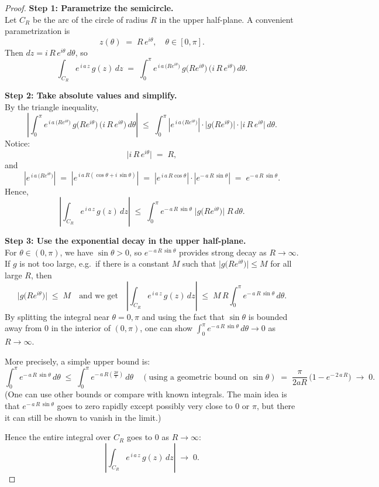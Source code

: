 \documentclass[12pt]{article}
\theoremstyle{definition} %
\theoremstyle{plain} %
\begin{document}
\begin{proof}
\textbf{Step 1: Parametrize the semicircle.}\\
Let $C_R$ be the arc of the circle of radius $R$ in the upper half-plane.  A convenient parametrization is
\[
z(\theta) \;=\; R\,e^{i\theta},
\quad
\theta \in [0,\pi].
\]
Then $dz = i\,R\,e^{i\theta}\,d\theta$, so
\[
\int_{C_R} e^{\,i\,a\,z} \, g(z)\,dz
\;=\;
\int_{0}^{\pi} e^{\,i\,a\,\bigl(R e^{i\theta}\bigr)} 
\,g\bigl(R e^{i\theta}\bigr)\,\bigl(i\,R\,e^{i\theta}\bigr)\,d\theta.
\]

\noindent
\textbf{Step 2: Take absolute values and simplify.}\\
By the triangle inequality,
\[
\left|
\int_{0}^{\pi} e^{\,i\,a\,\bigl(R e^{i\theta}\bigr)} 
\,g\bigl(R e^{i\theta}\bigr)\,\bigl(i\,R\,e^{i\theta}\bigr)\,d\theta
\right|
\;\le\;
\int_{0}^{\pi} 
\left|
e^{\,i\,a\,\bigl(R e^{i\theta}\bigr)}
\right|
\cdot
\bigl|g\bigl(R e^{i\theta}\bigr)\bigr|
\cdot
\bigl|i\,R\,e^{i\theta}\bigr|
\,d\theta.
\]
Notice:
\[
\bigl|i\,R\,e^{i\theta}\bigr|
\;=\;
R,
\]
and
\[
\left|
e^{\,i\,a\,\bigl(R e^{i\theta}\bigr)}
\right|
\;=\;
\left|
e^{\,i\,a\,R(\cos\theta + i\,\sin\theta)}
\right|
\;=\;
\left|
e^{\,i\,a\,R\cos\theta}
\right|
\cdot
\left|
e^{-\,a\,R\,\sin\theta}
\right|
\;=\;
e^{-\,a\,R\,\sin\theta}.
\]
Hence,
\[
\left|
\int_{C_R} e^{\,i\,a\,z} \, g(z)\,dz
\right|
\;\le\;
\int_{0}^{\pi} 
e^{-\,a\,R\,\sin\theta}
\;\bigl|g\bigl(R e^{i\theta}\bigr)\bigr|
\;R
\,d\theta.
\]

\noindent
\textbf{Step 3: Use the exponential decay in the upper half-plane.}\\
For $\theta\in(0,\pi)$, we have $\sin\theta>0$, so $e^{-\,a\,R\,\sin\theta}$ provides strong decay as $R\to\infty$.  If $g$ is not too large, e.g.\ if there is a constant $M$ such that 
$\bigl|g\bigl(Re^{i\theta}\bigr)\bigr|\le M$ for all large $R$, 
then
\[
\bigl|g\bigl(R e^{i\theta}\bigr)\bigr|
\;\le\; M
\quad
\text{and we get}
\quad
\left|
\int_{C_R} e^{\,i\,a\,z} \, g(z)\,dz
\right|
\;\le\;
M \,R
\int_{0}^{\pi} 
e^{-\,a\,R\,\sin\theta}\,d\theta.
\]
By splitting the integral near $\theta=0,\pi$ and using the fact that $\sin\theta$ is bounded away from 0 in the interior of $(0,\pi)$, one can show 
\(\displaystyle \int_{0}^{\pi} e^{-\,a\,R\,\sin\theta}\,d\theta \to 0\) 
as $R\to\infty$.  

More precisely, a simple upper bound is:
\[
\int_{0}^{\pi} e^{-\,a\,R\,\sin\theta}\,d\theta 
\;\le\;
\int_{0}^{\pi} e^{-\,a\,R\left(\frac{2\theta}{\pi}\right)}\,d\theta
\quad (\text{using a geometric bound on }\sin\theta)
\;=\;
\frac{\pi}{2aR}\,\bigl(1 - e^{-\,2\,a\,R}\bigr)
\;\longrightarrow\;0.
\]
(One can use other bounds or compare with known integrals. The main idea is that $e^{-\,a\,R\,\sin\theta}$ goes to zero rapidly except possibly very close to $0$ or $\pi$, but there it can still be shown to vanish in the limit.)

\noindent
Hence the entire integral over $C_R$ goes to $0$ as $R\to\infty$:
\[
\left|\int_{C_R} e^{\,i\,a\,z}\,g(z)\,dz\right|\;\longrightarrow\;0.
\]
\end{proof}
\end{document}
